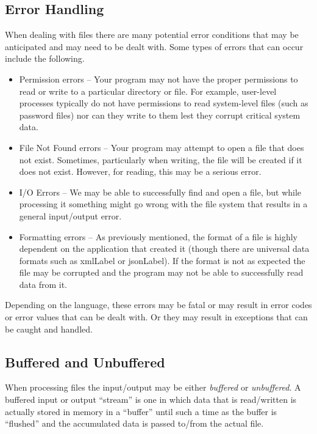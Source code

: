 \subsection{Error Handling}

When dealing with files there are many potential error
conditions that may be anticipated and may need to be
dealt with.  Some types of errors that can occur include
the following.

\begin{itemize}
  \item Permission errors -- Your program may not have
  	the proper permissions to read or write to a particular
	directory or file.  For example, user-level processes
	typically do not have permissions to read system-level
	files (such as password files) nor can they write to them
	lest they corrupt critical system data.  
  \item File Not Found errors -- Your program may attempt
  	to open a file that does not exist.  Sometimes, particularly
	when writing, the file will be created if it does not 
	exist.  However, for reading, this may be a
	serious error.
  \item I/O Errors -- We may be able to successfully find
  	and open a file, but while processing it something might
	go wrong with the file system that results in a general
	input/output error.
  \item Formatting errors -- As previously mentioned, the
  	format of a file is highly dependent on the application
	that created it (though there are universal data formats
	such as \gls{xmlLabel} or \gls{jsonLabel}).  If the
	format is not as expected the file may be corrupted and
	the program may not be able to successfully read 
	data from it.
\end{itemize}

Depending on the language, these errors may be fatal or may
result in error codes or error values that can be dealt with.
Or they may result in exceptions that can be caught and handled.

\subsection{Buffered and Unbuffered}

When processing files the input/output may be either 
\emph{buffered} or \emph{unbuffered}.  A buffered input or
output ``stream'' is one in which data that is read/written
is actually stored in memory in a ``buffer'' until such a 
time as the buffer is ``flushed'' and the accumulated data
is passed to/from the actual file.  

